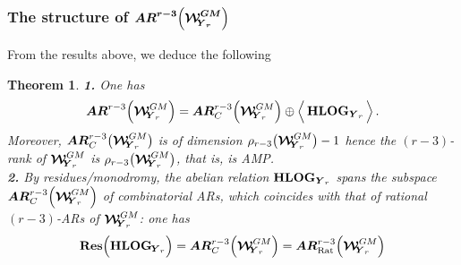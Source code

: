 \documentclass[11pt]{amsart}
\newcommand{\sk}{\smallskip}
\newtheorem{thm}{Theorem}[section]
\begin{document}
\subsubsection{\bf The structure of $\boldsymbol{{AR}^{r-3}\Big( \boldsymbol{\mathcal W}^{GM}_{\hspace{-0.1cm} \boldsymbol{Y}_r}\Big)}$}
From the results above, we deduce the following
\begin{thm}
\label{THM:Main-r=4,5,6,7}
{\bf 1.} One has 
\begin{equation}
\label{Eq:Decomp-AR(r-3)-WGM-r}
\boldsymbol{AR}^{r-3}\Big( \boldsymbol{\mathcal W}^{GM}_{\hspace{-0.1cm} \boldsymbol{Y}_r}\Big)
=\boldsymbol{AR}^{r-3}_C\Big( \boldsymbol{\mathcal W}^{GM}_{\hspace{-0.1cm} \boldsymbol{Y}_r}\Big)\oplus \Big\langle \,
 {\bf HLOG}_{ \boldsymbol{Y}_r}\,
\Big\rangle\, . 
\end{equation}
Moreover, $\boldsymbol{AR}^{r-3}_C\big( \boldsymbol{\mathcal W}^{GM}_{\hspace{-0.1cm} \boldsymbol{Y}_r}\big)$ is of dimension $\rho_{r-3}\big(\boldsymbol{\mathcal W}^{GM}_{\hspace{-0.1cm} \boldsymbol{Y}_r}\big)-1$ hence the $(r-3)$-rank of 
$ \boldsymbol{\mathcal W}^{GM}_{\hspace{-0.1cm} \boldsymbol{Y}_r}$ is 
$\rho_{r-3}\big(\boldsymbol{\mathcal W}^{GM}_{\hspace{-0.1cm} \boldsymbol{Y}_r}\big)$, that is,  is  AMP. 
\sk \\
{\bf 2.} By residues/monodromy, the abelian relation 
$ {\bf HLOG}_{ \boldsymbol{Y}_r}$
  spans  the subspace $\boldsymbol{AR}^{r-3}_C\Big( \boldsymbol{\mathcal W}_{\hspace{-0.1cm} \boldsymbol{Y}_r}^{GM}\Big)$ 
  of combinatorial ARs, which coincides with that of rational $(r-3)$-ARs of $\boldsymbol{\mathcal W}_{\hspace{-0.1cm} \boldsymbol{Y}_r}^{GM}$: one has 
  $$
  {\bf Res}\Big( {\bf HLOG}_{\hspace{-0.03cm} \boldsymbol{Y}_r} \Big) 
  = 
  \boldsymbol{AR}^{r-3}_C\Big( \boldsymbol{\mathcal W}_{\hspace{-0.1cm} \boldsymbol{ Y}_r}^{GM}\Big)=\boldsymbol{AR}^{r-3}_{\rm Rat}\Big( \boldsymbol{\mathcal W}_{\hspace{-0.1cm} \boldsymbol{Y}_r}^{GM}\Big)
$$
\end{thm}
\end{document}
